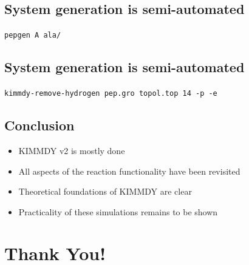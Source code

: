 \documentclass[
  letterpaper,
  DIV=11,
  numbers=noendperiod]{scrartcl}
\providecommand{\tightlist}{%
  \setlength{\itemsep}{0pt}\setlength{\parskip}{0pt}}\usepackage{longtable,booktabs,array}
\begin{document}
\hypertarget{system-generation-is-semi-automated}{%
\subsection{System generation is
semi-automated}\label{system-generation-is-semi-automated}}

\texttt{pepgen\ A\ ala/}

\hypertarget{system-generation-is-semi-automated-1}{%
\subsection{System generation is
semi-automated}\label{system-generation-is-semi-automated-1}}

\texttt{kimmdy-remove-hydrogen\ pep.gro\ topol.top\ 14\ -p\ -e}

\hypertarget{conclusion}{%
\subsection{Conclusion}\label{conclusion}}

\begin{itemize}
\tightlist
\item
  KIMMDY v2 is mostly done
\item
  All aspects of the reaction functionality have been revisited
\item
  Theoretical foundations of KIMMDY are clear
\item
  Practicality of these simulations remains to be shown
\end{itemize}

\hypertarget{thank-you}{%
\section{Thank You!}\label{thank-you}}
\end{document}
